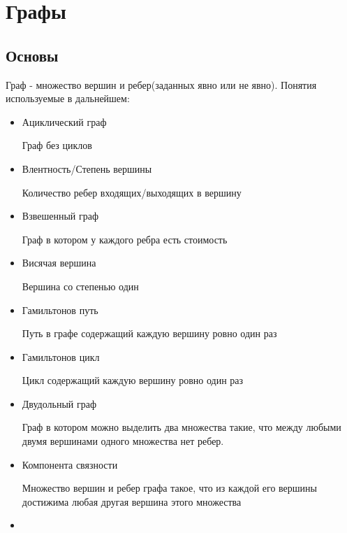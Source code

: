 \chapter{Графы}
\section{Основы}
Граф - множество вершин и ребер(заданных явно или не явно). Понятия используемые в дальнейшем:
\begin{itemize} 
\item 
    Ациклический граф
    \begin{mydef}
        Граф без циклов
    \end{mydef}
\item     
    Влентность/Степень вершины
    \begin{mydef}
        Количество ребер входящих/выходящих в вершину
    \end{mydef}
\item     
    Взвешенный граф
    \begin{mydef}
        Граф в котором у каждого ребра есть стоимость
    \end{mydef}
\item     
    Висячая вершина
    \begin{mydef}
        Вершина со степенью один
    \end{mydef}
\item     
    Гамильтонов путь
    \begin{mydef}
        Путь в графе содержащий каждую вершину ровно один раз
    \end{mydef}
\item     
    Гамильтонов цикл
    \begin{mydef}
        Цикл содержащий каждую вершину ровно один раз
    \end{mydef}
\item     
    Двудольный граф
    \begin{mydef}
        Граф в котором можно выделить два множества такие, что между         любыми двумя вершинами одного множества нет ребер.
    \end{mydef}
    \newpage %
\item     
    Компонента связности
    \begin{mydef}
        Множество вершин и ребер графа такое, что из каждой его вершины
        достижима любая другая вершина этого множества
    \end{mydef}
\item     

\end{itemize}
